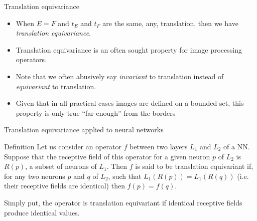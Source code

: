 \documentclass[xcolor=pdftex,dvipsnames,table,mathserif]{beamer}
\begin{document}
\begin{frame}{Translation equivariance}

\begin{itemize}
  \item When $E=F$ and $t_E$ and $t_F$ are the same, any, translation, then we have \emph{translation equivariance}.
\item Translation equivariance is an often sought property for image processing operators.
\item Note that we often abusively say \emph{invariant} to translation instead of \emph{equivariant} to translation.
\item Given that in all practical cases images are defined on a bounded set, this property is only true ``far enough'' from the borders
\end{itemize}

\end{frame}

\begin{frame}{Translation equivariance applied to neural networks}

\begin{block}{Definition}
  Let us consider an operator $f$ between two layers $L_1$ and $L_2$ of a NN. Suppose that the receptive field of this operator for a given neuron $p$ of $L_2$ is $R(p)$, a subset of neurons of $L_1$. Then $f$ is said to be translation equivariant if, for any two neurons $p$ and $q$ of $L_2$, such that $L_1(R(p)) = L_1(R(q))$ (i.e. their receptive fields are identical) then $f(p) = f(q)$.
\end{block}

\begin{alertblock}{}
  Simply put, the operator is translation equivariant if identical receptive fields produce identical values.
\end{alertblock}

\end{frame}
\end{document}
